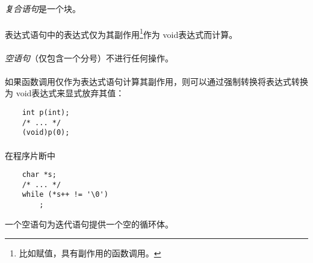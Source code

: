 {                                                
\syntax
\paragraph{}

\semantic
\paragraph{}
\textit{复合语句}是一个块。

\syntax
\paragraph{}

\semantic
\paragraph{}
表达式语句中的表达式仅为其副作用\footnote{比如赋值，具有副作用的函数调用。}作为
void表达式而计算。

\paragraph{}
\textit{空语句}（仅包含一个分号）不进行任何操作。

\paragraph{}
\ex 如果函数调用仅作为表达式语句计算其副作用，则可以通过强制转换将表达式转换为
void表达式来显式放弃其值：
\begin{lstlisting}
    int p(int);
    /* ... */
    (void)p(0);
\end{lstlisting}

\paragraph{}
\ex 在程序片断中
\begin{lstlisting}
    char *s;
    /* ... */
    while (*s++ != '\0')
        ;
\end{lstlisting}
一个空语句为迭代语句提供一个空的循环体。

}
